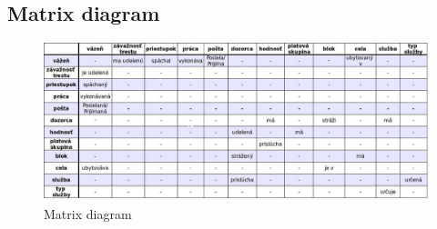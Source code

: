 \documentclass[slovak, 12pt, Times New Roman]{article}
\begin{document}
		\subsection{Matrix diagram}
			\begin{figure}[!htb]
				\centering
				\includegraphics[scale=0.45]{matrixDia.png}
				\caption{Matrix diagram}
				\label{fig:Reinforcement}
			\end{figure}
			\clearpage
\end{document}
